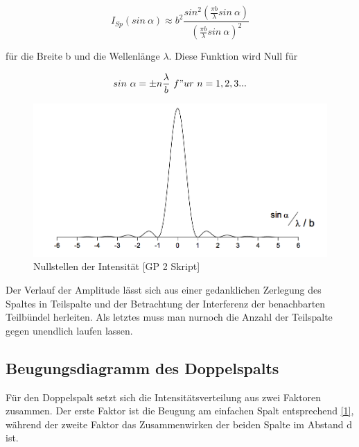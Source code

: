 \documentclass{article}
\begin{document}
\vspace{0,25cm}
\begin{equation}
\label{1}
I_{Sp}(sin\ \alpha)\approx b^2 \frac{sin^2(\frac{\pi b}{\lambda}sin\ \alpha)}{(\frac{\pi b}{\lambda}sin\ \alpha)^2}
\end{equation}

\vspace{0,25cm}

für die Breite b und die Wellenlänge  \(\lambda \).
Diese Funktion wird Null für

\vspace{0,25cm}

\begin{equation}
\label{2}
sin\ \alpha = \pm n \frac{\lambda}{b}\  f"ur\ n = 1,2,3...
\end{equation}

\vspace{0,25cm}
\begin{figure}[htbp]
\centering
\includegraphics[scale=0.3]{BEU.png}
\begin{center}
\caption{Nullstellen der Intensität [GP 2 Skript]}
\end{center}
\end{figure}

Der Verlauf der Amplitude lässt sich aus einer gedanklichen Zerlegung des Spaltes in Teilspalte und der Betrachtung der Interferenz der benachbarten Teilbündel herleiten. Als letztes muss man nurnoch die Anzahl der Teilspalte gegen unendlich laufen lassen.

\subsection{Beugungsdiagramm des Doppelspalts}
Für den Doppelspalt setzt sich die Intensitätsverteilung aus zwei Faktoren zusammen. Der erste Faktor ist die Beugung am einfachen Spalt entsprechend \eqref{1}, während der zweite Faktor das Zusammenwirken der beiden Spalte im Abstand d ist.
\end{document}
